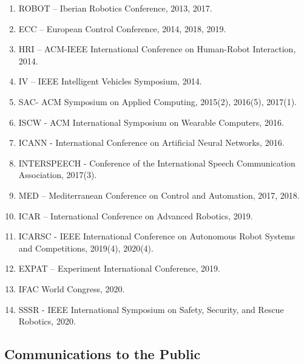 \begin{enumerate}
\item
  ROBOT -- Iberian Robotics Conference, 2013, 2017.
\item
  ECC -- European Control Conference, 2014, 2018, 2019.
\item
  HRI -- ACM-IEEE International Conference on Human-Robot Interaction,
  2014.
\item
  IV -- IEEE Intelligent Vehicles Symposium, 2014.
\item
  SAC- ACM Symposium on Applied Computing, 2015(2), 2016(5), 2017(1).
\item
  ISCW - ACM International Symposium on Wearable Computers, 2016.
\item
  ICANN - International Conference on Artificial Neural Networks, 2016.
\item
  INTERSPEECH - Conference of the International Speech Communication
  Association, 2017(3).
\item
  MED -- Mediterranean Conference on Control and Automation, 2017, 2018.
\item
  ICAR -- International Conference on Advanced Robotics, 2019.
\item
  ICARSC - IEEE International Conference on Autonomous Robot Systems and
  Competitions, 2019(4), 2020(4).
\item
  EXPAT -- Experiment International Conference, 2019.
\item
  IFAC World Congress, 2020.
\item
  SSSR - IEEE International Symposium on Safety, Security, and Rescue
  Robotics, 2020.
\end{enumerate}

\subsection{Communications to the
Public}\label{communications-to-the-public}

